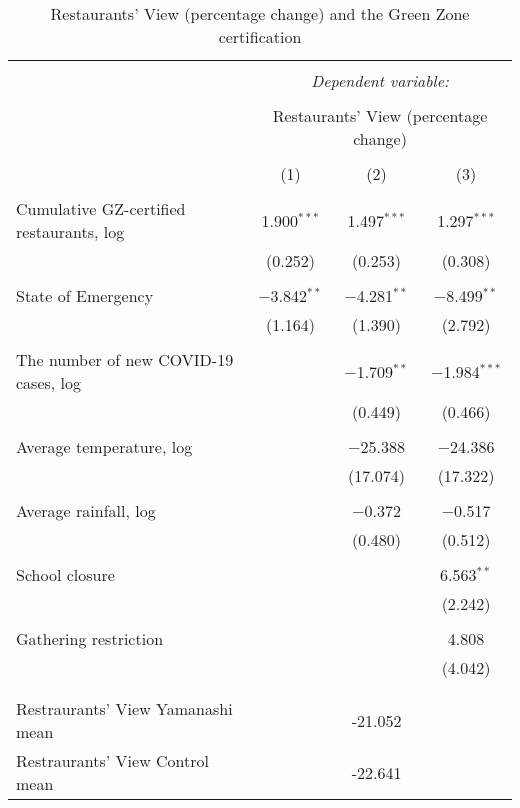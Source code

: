
\begin{table}[!htbp] \centering 
  \caption{Restaurants' View (percentage change) and the Green Zone certification} 
  \label{} 
\footnotesize 
\begin{tabular}{@{\extracolsep{1pt}}lccc} 
\\[-1.8ex]\hline 
\hline \\[-1.8ex] 
 & \multicolumn{3}{c}{\textit{Dependent variable:}} \\ 
\cline{2-4} 
\\[-1.8ex] & \multicolumn{3}{c}{Restaurants' View (percentage change) } \\ 
\\[-1.8ex] & (1) & (2) & (3)\\ 
\hline \\[-1.8ex] 
 Cumulative GZ-certified restaurants, log & 1.900$^{***}$ & 1.497$^{***}$ & 1.297$^{***}$ \\ 
  & (0.252) & (0.253) & (0.308) \\ 
  & & & \\ 
 State of Emergency & $-$3.842$^{**}$ & $-$4.281$^{**}$ & $-$8.499$^{**}$ \\ 
  & (1.164) & (1.390) & (2.792) \\ 
  & & & \\ 
 The number of new COVID-19 cases, log &  & $-$1.709$^{**}$ & $-$1.984$^{***}$ \\ 
  &  & (0.449) & (0.466) \\ 
  & & & \\ 
 Average temperature, log &  & $-$25.388 & $-$24.386 \\ 
  &  & (17.074) & (17.322) \\ 
  & & & \\ 
 Average rainfall, log &  & $-$0.372 & $-$0.517 \\ 
  &  & (0.480) & (0.512) \\ 
  & & & \\ 
 School closure &  &  & 6.563$^{**}$ \\ 
  &  &  & (2.242) \\ 
  & & & \\ 
 Gathering restriction &  &  & 4.808 \\ 
  &  &  & (4.042) \\ 
  & & & \\ 
\hline \\[-1.8ex] 
Restraurants' View Yamanashi mean &  & -21.052 &  \\ 
Restraurants' View Control mean &  & -22.641 &  \\ 

\end{tabular}
\end{table}
